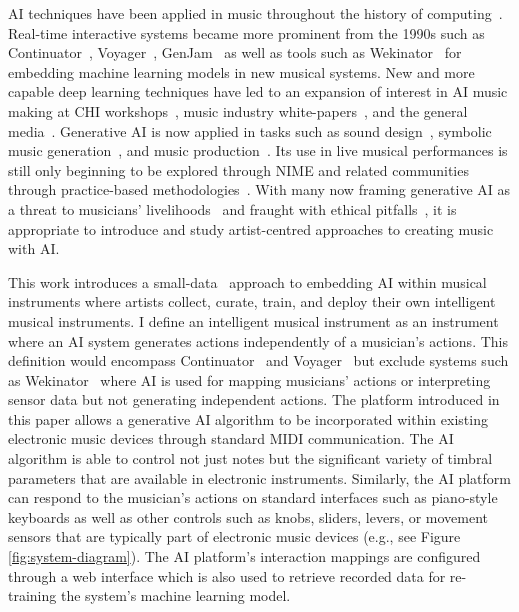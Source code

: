\documentclass[sigconf]{nimeart}
\begin{document}
AI techniques have been applied in music throughout the history of computing~\cite{roads-music-AI-1985}. Real-time interactive systems became more prominent from the 1990s such as Continuator~\cite{Pachet:2003wd},  Voyager~\cite{Lewis:2000fu}, GenJam~\cite{Biles:2007aa} as well as tools such as Wekinator~\cite{fiebrink_meta-instrument_2009} for embedding machine learning models in new musical systems.
New and more capable deep learning techniques have led to an expansion of interest in AI music making at CHI workshops~\cite{genaichi2022}, music industry white-papers~\cite{goldmedia_ai_2024}, and the general media~\cite{musicpublishers}. Generative AI is now applied in tasks such as sound design~\cite{sound_design_ai_2024}, symbolic music generation~\cite{ji_survey_2024}, and music production~\cite{deruty_development_2022}. Its use in live musical performances is still only beginning to be explored through NIME and related communities through practice-based methodologies~\cite[e.g.,][]{privato-hauntography-2024, stefansdottir_intelligent_2025}.
With many now framing generative AI as a threat to musicians' livelihoods~\cite{goldmedia_ai_2024} and fraught with ethical pitfalls~\cite{ethical_genaudio_2023}, it is appropriate to introduce and study artist-centred approaches to creating music with AI.

This work introduces a small-data~\cite{Vigliensoni:2022} approach to embedding AI within musical instruments where artists collect, curate, train, and deploy their own intelligent musical instruments.
I define an intelligent musical instrument as an instrument where an AI system generates actions independently of a musician's actions.
This definition would encompass Continuator~\cite{Pachet:2003wd} and Voyager~\cite{Lewis:2000fu} but exclude systems such as Wekinator~\cite{fiebrink_meta-instrument_2009} where AI is used for mapping musicians' actions or interpreting sensor data but not generating independent actions.
The platform introduced in this paper allows a generative AI algorithm to be incorporated within existing electronic music devices through standard MIDI communication. 
The AI algorithm is able to control not just notes but the significant variety of timbral parameters that are available in electronic instruments. 
Similarly, the AI platform can respond to the musician's actions on standard interfaces such as piano-style keyboards as well as other controls such as knobs, sliders, levers, or movement sensors that are typically part of electronic music devices (e.g., see Figure \ref{fig:system-diagram}).
The AI platform's interaction mappings are configured through a web interface which is also used to retrieve recorded data for re-training the system's machine learning model.
\end{document}
